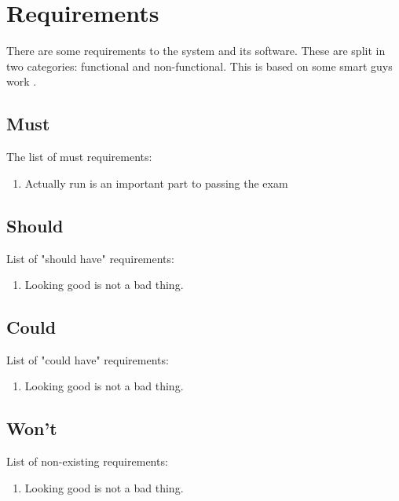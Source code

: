 \section{Requirements}
There are some requirements to the system and its software. These are split in two categories: functional and non-functional. This is based on some smart guys work \cite[citation needed]{keylist}.

\subsection{Must}
The list of must requirements:
\begin{enumerate}
	\item Actually run is an important part to passing the exam
\end{enumerate}

\subsection{Should}
List of "should have" requirements:
\begin{enumerate}
	\item Looking good is not a bad thing.
\end{enumerate}

\subsection{Could}
List of "could have" requirements:
\begin{enumerate}
	\item Looking good is not a bad thing.
\end{enumerate}

\subsection{Won't}
List of non-existing requirements:
\begin{enumerate}
	\item Looking good is not a bad thing.
\end{enumerate}